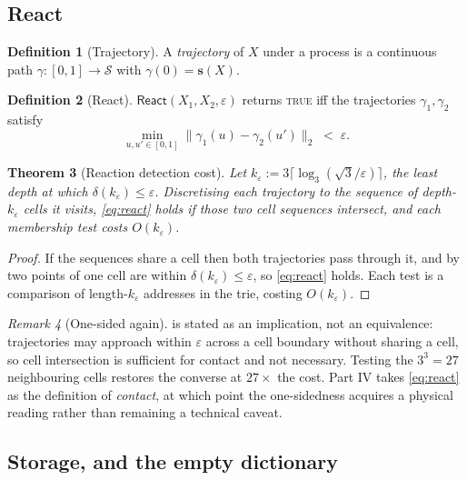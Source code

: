 \documentclass[11pt,twocolumn,a4paper]{article}
\theoremstyle{thmstyle}
\newtheorem{theorem}{Theorem}[section]
\theoremstyle{definition}
\newtheorem{definition}[theorem]{Definition}
\theoremstyle{remark}
\newtheorem{remark}[theorem]{Remark}
\newcommand{\Sspace}{\mathcal{S}}
\newcommand{\norm}[1]{\lVert#1\rVert}
\newcommand{\eps}{\varepsilon}
\begin{document}
\subsection{React}

\begin{definition}[Trajectory]
\label{def:trajectory}
A \emph{trajectory} of $X$ under a process is a continuous path
$\gamma\colon[0,1]\to\Sspace$ with $\gamma(0)=\mathbf{s}(X)$.
\end{definition}

\begin{definition}[React]
\label{def:react}
$\textsf{React}(X_1,X_2,\eps)$ returns \textsc{true} iff the
trajectories $\gamma_1,\gamma_2$ satisfy
\begin{equation}
  \min_{u,u'\in[0,1]}\norm{\gamma_1(u)-\gamma_2(u')}_2 \;<\; \eps.
  \label{eq:react}
\end{equation}
\end{definition}

\begin{theorem}[Reaction detection cost]
\label{thm:react}
Let $k_\eps := 3\lceil\log_3(\sqrt3/\eps)\rceil$, the least depth at
which $\delta(k_\eps)\leq\eps$. Discretising each trajectory to the
sequence of depth-$k_\eps$ cells it visits, \eqref{eq:react} holds if
those two cell sequences intersect, and each membership test costs
$O(k_\eps)$.
\end{theorem}

\begin{proof}
If the sequences share a cell then both trajectories pass through it,
and by  two points of one cell are within
$\delta(k_\eps)\leq\eps$, so \eqref{eq:react} holds. Each test is a
comparison of length-$k_\eps$ addresses in the trie, costing
$O(k_\eps)$.
\end{proof}

\begin{remark}[One-sided again]
\label{rem:react-onesided}
 is stated as an implication, not an equivalence:
trajectories may approach within $\eps$ across a cell boundary without
sharing a cell, so cell intersection is sufficient for contact and not
necessary. Testing the $3^3 = 27$ neighbouring cells restores the
converse at $27\times$ the cost. Part IV takes \eqref{eq:react} as the
definition of \emph{contact}, at which point the one-sidedness acquires
a physical reading rather than remaining a technical caveat.
\end{remark}

\subsection{Storage, and the empty dictionary}
\end{document}

